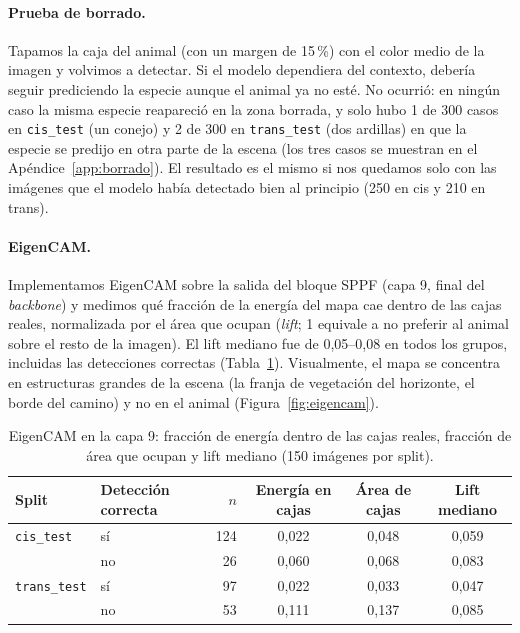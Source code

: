 \paragraph{Prueba de borrado.} Tapamos la caja del animal (con un margen de
15\,\%) con el color medio de la imagen y volvimos a detectar. Si el modelo
dependiera del contexto, debería seguir prediciendo la especie aunque el animal
ya no esté. No ocurrió: en ningún caso la misma especie reapareció en la zona
borrada, y solo hubo 1 de 300 casos en \texttt{cis\_test} (un conejo) y 2 de 300
en \texttt{trans\_test} (dos ardillas) en que la especie se predijo en otra parte
de la escena (los tres casos se muestran en el Apéndice~\ref{app:borrado}). El
resultado es el mismo si nos quedamos solo con las imágenes que el modelo había
detectado bien al principio (250 en cis y 210 en trans).

\paragraph{EigenCAM.} Implementamos EigenCAM sobre la salida del bloque SPPF
(capa 9, final del \emph{backbone}) y medimos qué fracción de la energía del
mapa cae dentro de las cajas reales, normalizada por el área que ocupan
(\emph{lift}; 1 equivale a no preferir al animal sobre el resto de la imagen).
El lift mediano fue de 0,05--0,08 en todos los grupos, incluidas las detecciones
correctas (Tabla~\ref{tab:eigencam}). Visualmente, el mapa se concentra en
estructuras grandes de la escena (la franja de vegetación del horizonte, el
borde del camino) y no en el animal (Figura~\ref{fig:eigencam}).

\begin{table}[h]
  \centering
  \caption{EigenCAM en la capa 9: fracción de energía dentro de las cajas
  reales, fracción de área que ocupan y lift mediano (150 imágenes por split).}
  \label{tab:eigencam}
  \begin{tabular}{llrccc}
    \toprule
    Split & Detección correcta & $n$ & Energía en cajas & Área de cajas & Lift mediano \\
    \midrule
    \texttt{cis\_test}   & sí  & 124 & 0,022 & 0,048 & 0,059 \\
                         & no  &  26 & 0,060 & 0,068 & 0,083 \\
    \texttt{trans\_test} & sí  &  97 & 0,022 & 0,033 & 0,047 \\
                         & no  &  53 & 0,111 & 0,137 & 0,085 \\
    \bottomrule
  \end{tabular}
\end{table}

